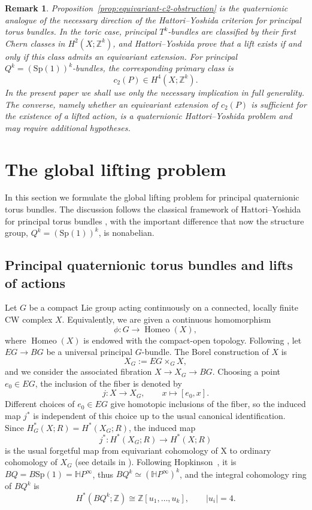 \documentclass[11pt,a4paper]{article}
\numberwithin{equation}{section}
\newtheorem{remark}[definition]{Remark}
\theoremstyle{named}
\begin{document}
\begin{remark}
Proposition~\ref{prop:equivariant-c2-obstruction} is the quaternionic analogue of the necessary direction of the Hattori--Yoshida criterion for principal torus bundles. In the toric case, principal \(T^k\)-bundles are classified by their first Chern classes in \(H^2(X;\mathbb Z^k)\), and Hattori--Yoshida prove that a lift exists if and only if this class admits an equivariant extension. For principal \(Q^k=(\text{Sp}(1))^k\)-bundles, the corresponding primary class is
\[
c_2(P)\in H^4(X;\mathbb Z^k).
\]
In the present paper we shall use only the necessary implication in full generality. The converse, namely whether an equivariant extension of \(c_2(P)\) is sufficient for the existence of a lifted action, is a quaternionic Hattori--Yoshida problem and may require additional hypotheses.
\end{remark}
\fi

\section{The global lifting problem}
\label{sec:global-lifting}

In this section we formulate the global lifting problem for principal quaternionic torus bundles. The discussion follows the classical framework of Hattori--Yoshida for principal torus bundles \cite{hatyos}, with the important difference that now the structure group, \(Q^k=(\text{Sp}(1))^k\), is nonabelian.

\subsection{Principal quaternionic torus bundles and lifts of actions}
Let \(G\) be a compact Lie group acting continuously on a connected, locally finite CW complex \(X\). Equivalently, we are given a continuous homomorphism \[ \phi:G\longrightarrow \operatorname{Homeo}(X), \] where \(\operatorname{Homeo}(X)\) is endowed with the compact-open topology. Following \cite{Hat02, michell}, let $EG\longrightarrow BG$
be a universal principal \(G\)-bundle. The Borel construction of \(X\) is
\[
X_G:=EG\times_G X,
\]
and we consider the associated fibration $X\longrightarrow X_G\longrightarrow BG$.
Choosing a point \(e_0\in EG\), the inclusion of the fiber is denoted by
\[
j:X\longrightarrow X_G,
\qquad
x\longmapsto [e_0,x].
\]
Different choices of \(e_0\in EG\) give homotopic inclusions of the fiber, so the induced map \(j^*\) is independent of this choice up to the usual canonical identification.  Since $H_G^*(X;R)=H^*(X_G;R)$, the induced map
\[
j^*:H^*(X_G;R)\longrightarrow H^*(X;R)
\]
is the usual forgetful map from equivariant cohomology of X to ordinary cohomology of $X_G$
(see details in \cite[p.14]{hatyos}).
Following Hopkinson~\cite[Proposition~6.2.3]{ho}, it is $BQ=B\text{Sp}(1)=\mathbb HP^\infty$, thus \(BQ^k\simeq(\mathbb HP^\infty)^k\), and the integral cohomology ring of \(BQ^k\) is
\[
H^*(BQ^k;\mathbb Z)
\cong
\mathbb Z[u_1,\ldots,u_k],
\qquad |u_i|=4.
\]
\end{document}
